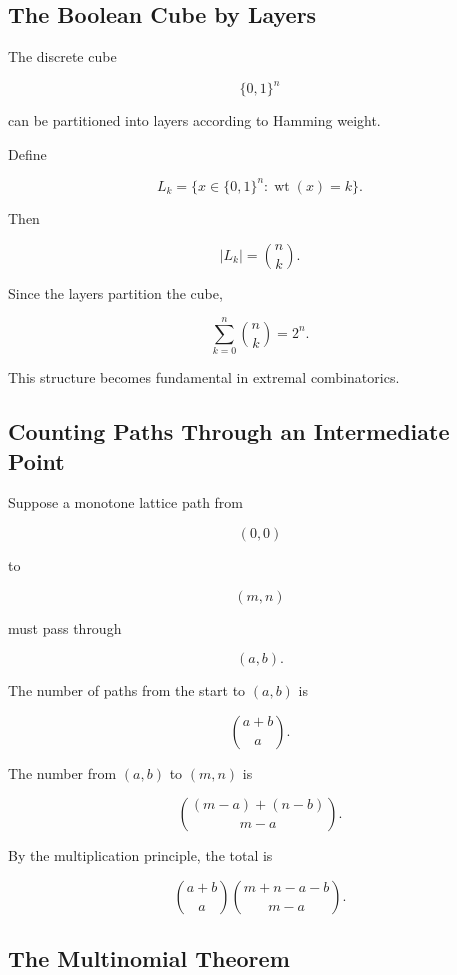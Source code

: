 \subsection{The Boolean Cube by Layers}
\label{subsec:boolean-cube-layers}

The discrete cube

\[
\{0,1\}^n
\]

can be partitioned into layers according to Hamming weight.

Define

\[
L_k
=
\{x\in\{0,1\}^n:\operatorname{wt}(x)=k\}.
\]

Then

\[
\boxed{
|L_k|=\binom{n}{k}.
}
\]

Since the layers partition the cube,

\[
\sum_{k=0}^{n}\binom{n}{k}
=
2^n.
\]

This structure becomes fundamental in extremal combinatorics.

\subsection{Counting Paths Through an Intermediate Point}
\label{subsec:lattice-path-intermediate}

Suppose a monotone lattice path from

\[
(0,0)
\]

to

\[
(m,n)
\]

must pass through

\[
(a,b).
\]

The number of paths from the start to \((a,b)\) is

\[
\binom{a+b}{a}.
\]

The number from \((a,b)\) to \((m,n)\) is

\[
\binom{(m-a)+(n-b)}{m-a}.
\]

By the multiplication principle, the total is

\[
\boxed{
\binom{a+b}{a}
\binom{m+n-a-b}{m-a}.
}
\]

\subsection{The Multinomial Theorem}
\label{subsec:multinomial-theorem}

